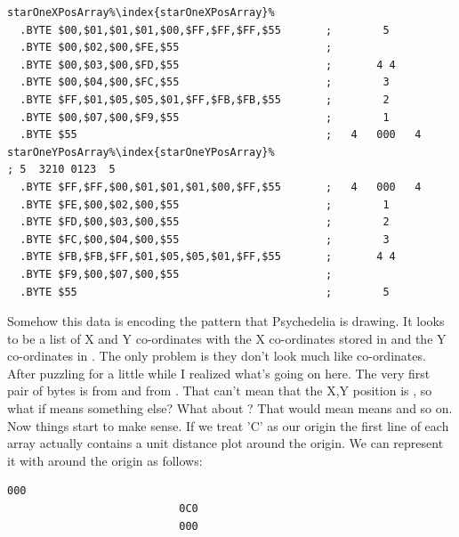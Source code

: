 \begin{lstlisting}[caption=Source code for the Star.,escapechar=\%]
starOneXPosArray%\index{starOneXPosArray}%  
  .BYTE $00,$01,$01,$01,$00,$FF,$FF,$FF,$55       ;        5       
  .BYTE $00,$02,$00,$FE,$55                       ;                
  .BYTE $00,$03,$00,$FD,$55                       ;       4 4      
  .BYTE $00,$04,$00,$FC,$55                       ;        3       
  .BYTE $FF,$01,$05,$05,$01,$FF,$FB,$FB,$55       ;        2       
  .BYTE $00,$07,$00,$F9,$55                       ;        1       
  .BYTE $55                                       ;   4   000   4  
starOneYPosArray%\index{starOneYPosArray}%                                  ; 5  3210 0123  5  
  .BYTE $FF,$FF,$00,$01,$01,$01,$00,$FF,$55       ;   4   000   4  
  .BYTE $FE,$00,$02,$00,$55                       ;        1       
  .BYTE $FD,$00,$03,$00,$55                       ;        2       
  .BYTE $FC,$00,$04,$00,$55                       ;        3       
  .BYTE $FB,$FB,$FF,$01,$05,$05,$01,$FF,$55       ;       4 4      
  .BYTE $F9,$00,$07,$00,$55                       ;                
  .BYTE $55                                       ;        5       
\end{lstlisting}

Somehow this data is encoding the pattern that Psychedelia is drawing. It looks to be a list of X and Y 
co-ordinates with the X co-ordinates stored in  and the Y co-ordinates in
. The only problem is they don't look much like co-ordinates. After puzzling 
for a little while I realized what's going on here. The very first pair of bytes is  from
 and  from . That can't mean that the X,Y
position is , so what if  means something else? What about ? That
would mean  means  and so on. Now things start to make sense. If we treat 'C' as our origin the first line of 
each array actually contains a unit distance plot around the origin. We can represent it with  around the origin as follows:

\begin{lstlisting}[escapechar=\%]
                           000      
                           0C0        
                           000      
\end{lstlisting}

